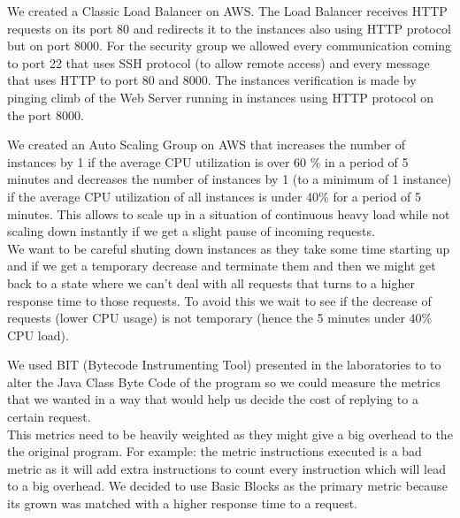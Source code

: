 \documentclass[times, 10pt,twocolumn]{article}
\begin{document}
   We created a Classic Load Balancer on AWS. The Load Balancer receives HTTP
   requests on its port 80 and redirects it to the instances also using HTTP
   protocol but on port 8000. For the security group we allowed every communication
   coming to port 22 that uses SSH protocol (to allow remote access) and every
   message that uses HTTP to port 80 and 8000. The instances verification is made 
   by pinging climb of the Web Server running in instances using HTTP protocol on
   the port 8000.

   We created an Auto Scaling Group on AWS that increases the number of instances by
   1 if the average CPU utilization is over 60 \% in a period of 5 minutes and
   decreases the number of instances by 1 (to a minimum of 1 instance) if the average CPU 
   utilization of all instances is under 40\% for a period of 5 minutes. This allows
   to scale up in a situation of continuous heavy load while not scaling down instantly
   if we get a slight pause of incoming requests. \\
   We want to be careful shuting down instances as they take some time starting up and if 
   we get a temporary decrease and terminate them and then we might get back to a state
   where we can't deal with all requests that turns to a higher response time to those 
   requests. To avoid this we wait to see if the decrease of requests (lower CPU usage)
   is not temporary (hence the 5 minutes under 40\% CPU load).

   We used BIT (Bytecode Instrumenting Tool) presented in the laboratories to 
   to alter the Java Class Byte Code of the program so we could measure the metrics
   that we wanted in a way that would help us decide the cost of replying to a certain request.\\
   This metrics need to be heavily weighted as they might give a big overhead to the 
   the original program. For example: the metric instructions executed is a bad metric
   as it will add extra instructions to count every instruction which will lead to a 
   big overhead.
   We decided to use Basic Blocks as the primary metric because its grown 
   was matched with a higher response time to a request. 
\end{document}
